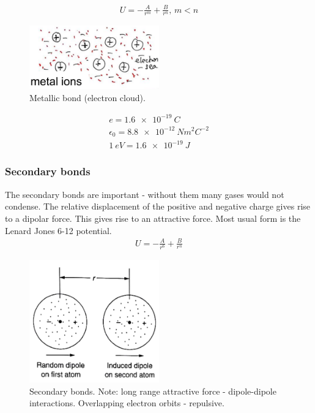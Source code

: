 \begin{gather}
	U = -\frac{A}{r^m} + \frac{B}{r^n}, \, m<n
\end{gather}
\begin{figure}[H]
	\centering
	\includegraphics[width = 0.5\textwidth]{./img/figure10.png}
	\caption{Metallic bond (electron cloud).}
\end{figure}
\begin{gather}
	e = \SI{1.6e-19}{C}\\
	\epsilon_0 = \SI{8.8e-12}{Nm^2C^{-2}}\\
	\SI{1}{eV} = \SI{1.6e-19}{J}
\end{gather}
\subsubsection{Secondary bonds}
The secondary bonds are important - without them many gases would not condense. The relative displacement of the positive and negative charge gives rise to a dipolar force. This gives rise to an attractive force. Most usual form is the Lenard Jones 6-12 potential.
\begin{gather}
	U = -\frac{A}{r^6} + \frac{B}{r^n}
\end{gather}
\begin{figure}[H]
	\centering
	\includegraphics[width = 0.5\textwidth]{./img/figure11.png}
	\caption{Secondary bonds. Note: long range attractive force -  dipole-dipole interactions. Overlapping electron orbits - repulsive.}
\end{figure}
